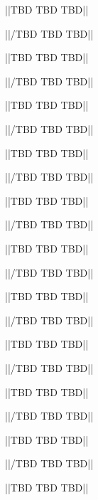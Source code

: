 ||TBD TBD TBD||

||/TBD TBD TBD||

\tertiaryEnd{}


||TBD TBD TBD||

||/TBD TBD TBD||

\tertiaryEnd{}


||TBD TBD TBD||

||/TBD TBD TBD||

\tertiaryEnd{}


||TBD TBD TBD||

||/TBD TBD TBD||

\tertiaryEnd{}


||TBD TBD TBD||

||/TBD TBD TBD||

\tertiaryEnd{}


||TBD TBD TBD||

||/TBD TBD TBD||

\tertiaryEnd{}


||TBD TBD TBD||

||/TBD TBD TBD||

\tertiaryEnd{}


||TBD TBD TBD||

||/TBD TBD TBD||

\tertiaryEnd{}


||TBD TBD TBD||

||/TBD TBD TBD||

\tertiaryEnd{}


||TBD TBD TBD||

||/TBD TBD TBD||

\tertiaryEnd{}


||TBD TBD TBD||


